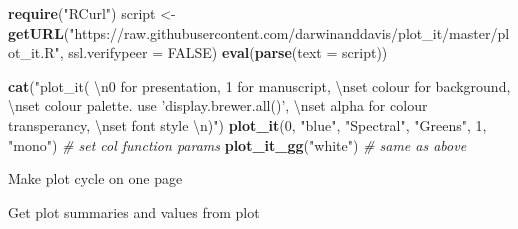 \documentclass[10,portrait]{article}
\newenvironment{Shaded}{\begin{snugshade}}{\end{snugshade}}
\newcommand{\KeywordTok}[1]{\textcolor[rgb]{0.13,0.29,0.53}{\textbf{#1}}}
\newcommand{\DataTypeTok}[1]{\textcolor[rgb]{0.13,0.29,0.53}{#1}}
\newcommand{\DecValTok}[1]{\textcolor[rgb]{0.00,0.00,0.81}{#1}}
\newcommand{\CharTok}[1]{\textcolor[rgb]{0.31,0.60,0.02}{#1}}
\newcommand{\StringTok}[1]{\textcolor[rgb]{0.31,0.60,0.02}{#1}}
\newcommand{\CommentTok}[1]{\textcolor[rgb]{0.56,0.35,0.01}{\textit{#1}}}
\newcommand{\OtherTok}[1]{\textcolor[rgb]{0.56,0.35,0.01}{#1}}
\newcommand{\OperatorTok}[1]{\textcolor[rgb]{0.81,0.36,0.00}{\textbf{#1}}}
\newcommand{\NormalTok}[1]{#1}
\begin{document}
\begin{Shaded}
\begin{Highlighting}[]
\KeywordTok{require}\NormalTok{(}\StringTok{"RCurl"}\NormalTok{)}
\NormalTok{script <-}\StringTok{ }\KeywordTok{getURL}\NormalTok{(}\StringTok{"https://raw.githubusercontent.com/darwinanddavis/plot_it/master/plot_it.R"}\NormalTok{, }
    \DataTypeTok{ssl.verifypeer =} \OtherTok{FALSE}\NormalTok{)}
\KeywordTok{eval}\NormalTok{(}\KeywordTok{parse}\NormalTok{(}\DataTypeTok{text =}\NormalTok{ script))}

\KeywordTok{cat}\NormalTok{(}\StringTok{"plot_it( }\CharTok{\textbackslash{}n}\StringTok{0 for presentation, 1 for manuscript, }\CharTok{\textbackslash{}n}\StringTok{set colour for background, }\CharTok{\textbackslash{}n}\StringTok{set colour palette. use 'display.brewer.all()', }\CharTok{\textbackslash{}n}\StringTok{set alpha for colour transperancy, }\CharTok{\textbackslash{}n}\StringTok{set font style }\CharTok{\textbackslash{}n}\StringTok{)"}\NormalTok{)}
\KeywordTok{plot_it}\NormalTok{(}\DecValTok{0}\NormalTok{, }\StringTok{"blue"}\NormalTok{, }\StringTok{"Spectral"}\NormalTok{, }\StringTok{"Greens"}\NormalTok{, }\DecValTok{1}\NormalTok{, }\StringTok{"mono"}\NormalTok{)  }\CommentTok{# set col function params}
\KeywordTok{plot_it_gg}\NormalTok{(}\StringTok{"white"}\NormalTok{)  }\CommentTok{# same as above }
\end{Highlighting}
\end{Shaded}

Make plot cycle on one page

\begin{Shaded}
\end{Shaded}

Get plot summaries and values from plot

\begin{Shaded}
\end{Shaded}
\end{document}
